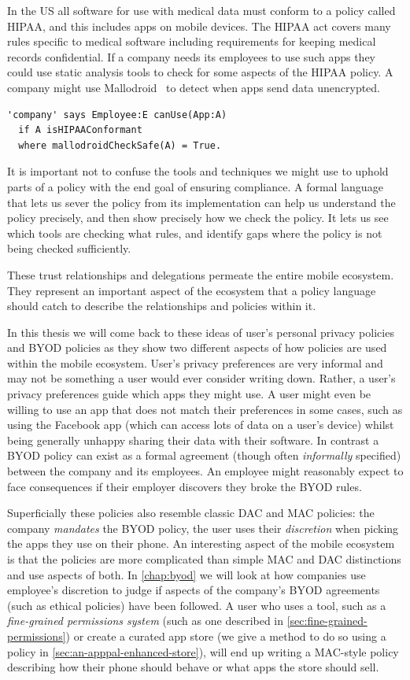 \documentclass[thesis.tex]{subfiles}
\begin{document}
In the US all software for use with medical data must conform to a policy
called \ac{HIPAA}, and this includes apps on mobile devices.  The \ac{HIPAA}
act covers many rules specific to medical software including requirements for
keeping medical records confidential.  If a company needs its employees to use
such apps they could use static analysis tools to check for some aspects of the
\ac{HIPAA} policy.  A company might use Mallodroid~\cite{fahl_why_2012} to
detect when apps send data unencrypted.  
%
\begin{lstlisting} 
'company' says Employee:E canUse(App:A) 
  if A isHIPAAConformant 
  where mallodroidCheckSafe(A) = True. 
\end{lstlisting}
%
It is important not to confuse the tools and techniques we might use to uphold
parts of a policy with the end goal of ensuring compliance.  A formal language
that lets us sever the policy from its implementation can help us understand
the policy precisely, and then show precisely how we check the policy.  It lets
us see which tools are checking what rules, and identify gaps where the policy
is not being checked sufficiently.

These trust relationships and delegations permeate the entire mobile
ecosystem.  They represent an important aspect of the ecosystem that a
policy language should catch to describe the
relationships and policies within it.


In this thesis we will come back to these ideas of user's personal
privacy policies and BYOD policies as they show two different aspects
of how policies are used within the mobile ecosystem.
%
User's privacy preferences are very informal and may not be something
a user would ever consider writing down.  Rather, a user's privacy
preferences guide which apps they might use. A user might even be
willing to use an app that does not match their preferences in some
cases, such as using the Facebook app (which can access lots of data
on a user's device) whilst being generally unhappy sharing their data
with their software.
%
In contrast a BYOD policy can exist as a formal agreement (though
often \emph{informally} specified) between the company and its
employees.  An employee might reasonably expect to face consequences
if their employer discovers they broke the BYOD rules.

Superficially these policies also resemble classic DAC and MAC
policies: the company \emph{mandates} the BYOD policy, the user uses
their \emph{discretion} when picking the apps they use on their phone.
An interesting aspect of the mobile ecosystem is that the policies are
more complicated than simple MAC and DAC distinctions and use aspects
of both.  In \autoref{chap:byod} we will look at how companies use
employee's discretion to judge if aspects of the company's BYOD
agreements (such as ethical policies) have been followed.  A user who
uses a tool, such as a \emph{fine-grained permissions system} (such as
one described in \autoref{sec:fine-grained-permissions}) or create a
curated app store (we give a method to do so using a policy in
\autoref{sec:an-apppal-enhanced-store}), will end up writing a
MAC-style policy describing how their phone should behave or what apps
the store should sell.
\end{document}
